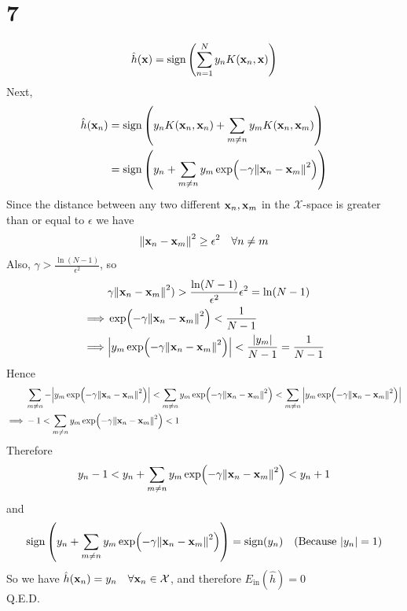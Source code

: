 \documentclass[11pt]{article}
\theoremstyle{definition}
\begin{document}
\section*{7}
\[
  \hat{h}(\vb{x}) = \text{sign}\left(\sum^N_{n = 1}y_nK(\vb{x}_n, \vb{x})\right)
\]
Next,
\begin{align*}
  \hat{h}(\vb{x}_n) &= \text{sign}\left(y_nK(\vb{x}_n, \vb{x}_n) + \sum_{m \neq n}y_mK(\vb{x}_n, \vb{x}_m)\right) \\ 
  &= \text{sign}\left(y_n + \sum_{m \neq n}y_m\exp(-\gamma\norm{\vb{x}_n - \vb{x}_m}^2)\right) \\ 
\end{align*}
Since the distance between any two different $\vb{x}_n, \vb{x}_m$ in the $\mathcal{X}$-space is greater than or equal to $\epsilon$ we have
\[
  \norm{\vb{x}_n - \vb{x}_m}^2 \geq \epsilon^2\quad \forall n \neq m
\]
Also, $\gamma > \frac{\ln(N - 1)}{\epsilon^2}$, so 
\begin{align*}
  &\gamma\norm{\vb{x}_n - \vb{x}_m}^2) > \frac{\ln(N - 1)}{\epsilon^2}\epsilon^2 = \ln(N - 1) \\ 
  \implies &\exp(-\gamma\norm{\vb{x}_n - \vb{x}_m}^2) < \frac{1}{N - 1} \\ 
  \implies &\abs{y_m\exp(-\gamma\norm{\vb{x}_n - \vb{x}_m}^2)} < \frac{\abs{y_m}}{N - 1} = \frac{1}{N - 1}
\end{align*}
Hence 
\begin{align*}
  &\sum_{m \neq n}-\abs{y_m\exp(-\gamma\norm{\vb{x}_n - \vb{x}_m}^2)} < \sum_{m \neq n}y_m\exp(-\gamma\norm{\vb{x}_n - \vb{x}_m}^2) < \sum_{m \neq n}\abs{y_m\exp(-\gamma\norm{\vb{x}_n - \vb{x}_m}^2)} \\
  \implies &-1 <  \sum_{m \neq n}y_m\exp(-\gamma\norm{\vb{x}_n - \vb{x}_m}^2) < 1
\end{align*}
Therefore 
\[
  y_n - 1 < y_n + \sum_{m \neq n}y_m\exp(-\gamma\norm{\vb{x}_n - \vb{x}_m}^2) < y_n + 1
\]
and 
\[
  \text{sign}\left(y_n + \sum_{m \neq n}y_m\exp(-\gamma\norm{\vb{x}_n - \vb{x}_m}^2)\right) = \text{sign}(y_n)\quad(\text{Because } \abs{y_n} = 1)
\]
So we have $\hat{h}(\vb{x}_n) = y_n\quad\forall \vb{x}_n\in\mathcal{X}$, and therefore $E_\text{in}(\hat{h}) = 0$ \\ 
Q.E.D.
\newpage
\end{document}

